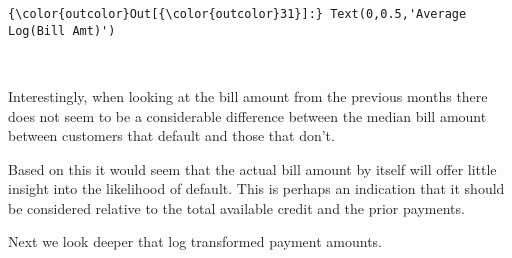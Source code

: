 \documentclass[11pt]{article}
\begin{document}
\begin{Verbatim}[commandchars=\\\{\}]
{\color{outcolor}Out[{\color{outcolor}31}]:} Text(0,0.5,'Average Log(Bill Amt)')
\end{Verbatim}
            
    \begin{center}
    \end{center}
    { \hspace*{\fill} \\}
    
    Interestingly, when looking at the bill amount from the previous months
there does not seem to be a considerable difference between the median
bill amount between customers that default and those that don't.

Based on this it would seem that the actual bill amount by itself will
offer little insight into the likelihood of default. This is perhaps an
indication that it should be considered relative to the total available
credit and the prior payments.

Next we look deeper that log transformed payment amounts.
\end{document}
